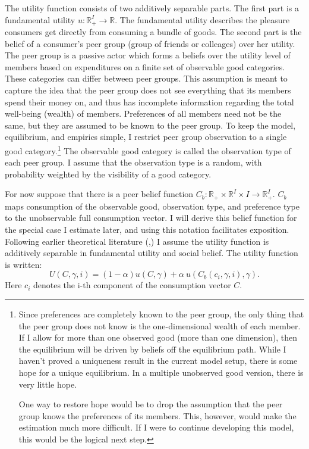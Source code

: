 \documentclass[12pt]{article}
\begin{document}
The utility function consists of two additively separable parts.  The first part is a fundamental utility $u:\mathbb{R}_+^{I}\rightarrow\mathbb{R}$.
The fundamental utility describes the pleasure consumers get directly from consuming a bundle of goods.
The second part is the belief of a consumer's peer group (group of friends or colleages) over her utility.
The peer group is a passive actor which forms a beliefs over the utility level of members based on expenditures on a finite set of observable good categories.
These categories can differ between peer groups.
This assumption is meant to capture the idea that the peer group does not see everything that its members spend their money on, and thus has incomplete information regarding the total well-being (wealth) of members.
Preferences of all members need not be the same, but they are assumed to be known to the peer group.
To keep the model, equilibrium, and empirics simple, I restrict peer group observation to a single good category.\footnote{Since preferences are completely known to the peer group, the only thing that the peer group does not know is the one-dimensional wealth of each member.  If I allow for more than one observed good (more than one dimension), then the equilibrium will be driven by beliefs off the equilibrium path. While I haven't proved a uniqueness result in the current model setup, there is some hope for a unique equilibrium.  In a multiple unobserved good version, there is very little hope.  

One way to restore hope would be to drop the assumption that the peer group knows the preferences of its members.  This, however, would make the estimation much more difficult.  If I were to continue developing this model, this would be the logical next step.}
The observable good category is called the observation type of each peer group.
I assume that the observation type is a random, with probability weighted by the visibility of a good category.

For now suppose that there is a peer belief function $C_b: \mathbb{R}_+\times\mathbb{R}^{I}\times I\rightarrow \mathbb{R}_+^{I}$.  $C_b$ maps consumption of the observable good, observation type, and preference type to the unobservable full consumption vector.
I will derive this belief function for the special case I estimate later, and using this notation facilitates exposition.
Following earlier theoretical literature (\citet{Heffetz2011},\citet{Ireland1994}) I assume the utility function is additively separable in fundamental utility and social belief.
The utility function is written:
\[U(C,\gamma,i) = (1-\alpha) u(C,\gamma) + \alpha\  u(C_b(c_i,\gamma,i),\gamma).\]
Here $c_i$ denotes the i-th component of the consumption vector $C$.
\end{document}
